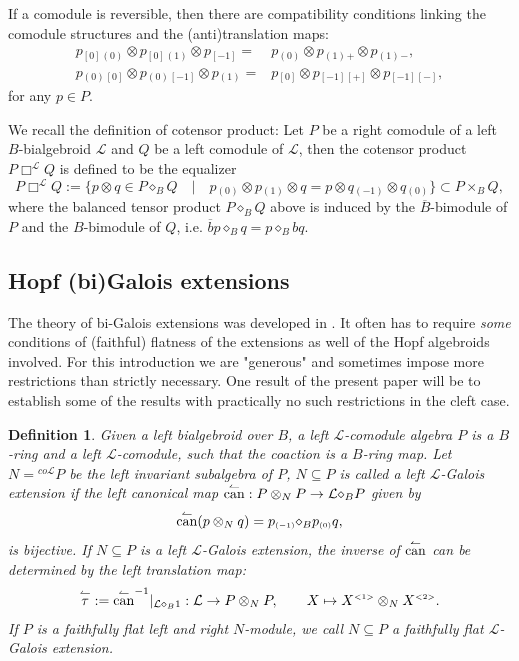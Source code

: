 \documentclass[a4paper,reqno]{amsart}
\numberwithin{equation}{section}
\theoremstyle{plain}
\newtheorem{defi}[thm]{Definition}
\theoremstyle{remark}
\numberwithin{equation}{section}
\newcommand{\ot}{\otimes}
\newcommand{\cL}{\mathcal{L}}
\newcommand{\BB}{\overline{B}}
\newcommand{\ltau}{\overset\leftharpoonup\tau}
\newcommand{\lcan}{\overset\leftharpoonup\can}
\newcommand{\tuno}[1]{{#1}{}{}^{\scriptscriptstyle{<1>}}}
\newcommand{\tdue}[1]{{#1}{}{}^{\scriptscriptstyle{<2>}}}
\newcommand{\z}{{}_{\scriptscriptstyle{(0)}}}
\newcommand{\rz}{{}_{\scriptscriptstyle{[0]}}}
\renewcommand{\o}{{}_{\scriptscriptstyle{(1)}}}
\newcommand{\mo}{{}_{\scriptscriptstyle{(-1)}}}
\newcommand{\rmo}{{}_{\scriptscriptstyle{[-1]}}}
\newcommand{\di}{{\diamond_{B}}}
\newcommand{\can}{{\rm can}}
\begin{document}
If a comodule is reversible, then there are compatibility conditions linking the comodule structures and the (anti)translation maps:
    \begin{align}\label{equ. regular map 7}
        p\rz\z\ot{}p\rz\o\ot p\rmo=&p\z\ot{} p\o{}_{+}\ot p\o{}_{-},\\
    \label{equ. regular map 8}
        p\z\rz\ot p\z\rmo\ot p\o=&p\rz\ot p\rmo{}_{[+]}\ot p\rmo{}_{[-]},
    \end{align}
    for any $p\in P$.   
   

 We recall the definition of cotensor product:
Let $P$ be a right comodule of a left $B$-bialgebroid $\cL$ and $Q$ be a left comodule of $\cL$, then the cotensor product $P\Box^{\cL} Q$ is defined to be the equalizer
\[P\Box^{\cL} Q:=\{p\ot q\in P\di{}Q\quad|\quad p\z\ot p\o\ot q=p\ot q\mo\ot q\z\}\subset P\times_BQ,\]
where the balanced tensor product $P\di{} Q$ above is induced by the $\BB$-bimodule of $P$ and the $B$-bimodule of $Q$, i.e. $\overline{b}p\di{}q=p\di{}bq$.
 




\subsection{Hopf (bi)Galois extensions}
The theory of bi-Galois extensions was developed in \cite{HS25}. It often has to require \emph{some} conditions of (faithful) flatness of the extensions as well of the Hopf algebroids involved. For this introduction we are "generous" and sometimes impose more restrictions than strictly necessary. One result of the present paper will be to establish some of the results with practically no such restrictions in the cleft case.



\begin{defi}
Given a left bialgebroid over $B$,    a left $\cL$-comodule algebra $P$ is a $B$-ring and a left $\cL$-comodule, such that the coaction is a $B$-ring map. Let $N={}^{co\cL}P$ be the left invariant subalgebra of $P$, $N\subseteq P$ is called a left $\cL$-Galois extension if the left canonical map $\lcan: P\ot_{N} P\to \cL\di{}P$ given by
    \[\lcan(p\ot_{N}q)=p\mo\di{}p\z q,\]
    is bijective. If $N\subseteq P$ is a
left $\cL$-Galois extension, the inverse of $\lcan$ can be determined by the left translation map:
    \begin{align}
        \ltau:=\lcan^{-1}|_{\cL\di{}1}:\cL\to P\ot_{N}P, \qquad X\mapsto \tuno{X}\otimes_{N}\tdue{X}.
    \end{align}
 If $P$ is a faithfully flat  left and right $N$-module, we call $N\subseteq P$ a faithfully flat $\cL$-Galois extension.
\end{defi}
\end{document}
